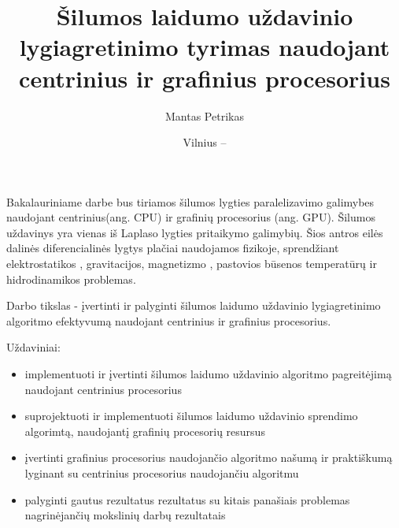 \documentclass{VUMIFPSbakalaurinis}
\title{Šilumos laidumo uždavinio lygiagretinimo tyrimas naudojant centrinius ir grafinius procesorius}
\author{Mantas Petrikas}
\date{Vilnius – \the\year}
\begin{document}
\maketitle







Bakalauriniame darbe bus tiriamos šilumos lygties paralelizavimo galimybes naudojant centrinius(ang. CPU) ir grafinių procesorius (ang. GPU). Šilumos uždavinys yra vienas iš Laplaso lygties pritaikymo galimybių. 
Šios antros eilės dalinės diferencialinės lygtys plačiai naudojamos fizikoje, sprendžiant elektrostatikos \cite{house2008analytic}, gravitacijos, magnetizmo \cite{blakely1996potential}, pastovios būsenos temperatūrų \cite {berntsson2001numerical} ir hidrodinamikos \cite{kadanoff1985simulating} problemas. 

Darbo tikslas - įvertinti ir palyginti šilumos laidumo uždavinio lygiagretinimo algoritmo efektyvumą naudojant centrinius ir grafinius procesorius.

Uždaviniai:
\begin{itemize}
    \item implementuoti ir įvertinti šilumos laidumo uždavinio algoritmo pagreitėjimą naudojant centrinius procesorius
    \item suprojektuoti ir implementuoti šilumos laidumo uždavinio sprendimo algorimtą, naudojantį grafinių procesorių resursus
    \item įvertinti grafinius procesorius naudojančio algoritmo našumą ir praktiškumą lyginant su centrinius procesorius naudojančiu algoritmu
    \item palyginti gautus rezultatus rezultatus su kitais panašiais problemas nagrinėjančių mokslinių darbų rezultatais
\end{itemize}
\end{document}
